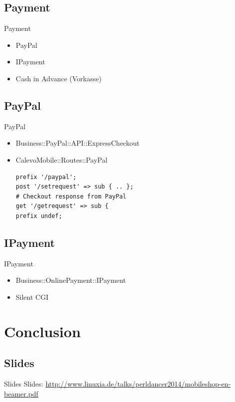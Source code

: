 \subsection{Payment}
\begin{frame}{Payment}
\begin{itemize}
\item PayPal
\item IPayment
\item Cash in Advance (Vorkasse)
\end{itemize}
\end{frame}

\subsection{PayPal}
\begin{frame}[fragile]{PayPal}
\begin{itemize}
\item Business::PayPal::API::ExpressCheckout
\item CalevoMobile::Routes::PayPal
\begin{lstlisting}
prefix '/paypal';
post '/setrequest' => sub { .. };
# Checkout response from PayPal
get '/getrequest' => sub {
prefix undef;
\end{lstlisting}
\end{itemize}
\end{frame}

\subsection{IPayment}
\begin{frame}[fragile]{IPayment}
\begin{itemize}
\item Business::OnlinePayment::IPayment
\item Silent CGI
\end{itemize}
\end{frame}


\section{Conclusion}

\subsection{Slides}

\begin{frame}{Slides}
Slides:
\url{http://www.linuxia.de/talks/perldancer2014/mobileshop-en-beamer.pdf}
\end{frame}




